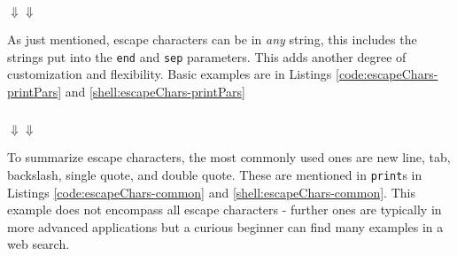\documentclass{book}
\newcommand{\pythonSub}[5]{
    \usemintedstyle{autumn}
    \begin{listing}[htb]
        \begin{mdframed}[backgroundcolor=codebg]
            \inputminted[firstline=#2, lastline=#3, linenos]{python}{#1}
        \end{mdframed}
        \caption{#4}
        \label{#5}
    \end{listing}
}
\newcommand{\shellSub}[5]{
    \begin{listing}[htb]
        \begin{mdframed}[backgroundcolor=codebg]
              
        \end{mdframed}
        \caption{#4}
        \label{#5}
    \end{listing}
}
\newcommand{\pythonAndShellSub}[8]{
\usemintedstyle{autumn}
    \begin{listing}[htb]
 	   \begin{mdframed}[backgroundcolor=codebg]
            \inputminted[firstline=#2, lastline=#3, linenos]{python}{#1}
        \end{mdframed}
        \hspace{5em}$\Downarrow$\hfill$\Downarrow$\hspace{5em}
        \begin{mdframed}[backgroundcolor=codebg]
              
        \end{mdframed}
        \caption{#7}
        \label{#8}
    \end{listing}
}
\begin{document}
\pythonAndShellSub{../../../docCode/chapter2/section2/printIntroEscapes.py}
{4}{11}
{../../../docCode/chapter2/section2/printIntroEscapes.txt}
{4}{12}
{}
{pyshell:escapeChars-newline}

As just mentioned, escape characters can be in \emph{any} string, this includes the strings put into the \texttt{end} and \texttt{sep} parameters. This adds another degree of customization and flexibility. Basic examples are in Listings \ref{code:escapeChars-printPars} and \ref{shell:escapeChars-printPars}

%
    
\pythonAndShellSub{../../../docCode/chapter2/section2/printIntroEscapes.py}
{11}{17}
{../../../docCode/chapter2/section2/printIntroEscapes.txt}
{13}{18}
{}
{pyshell:escapeChars-printPars}

To summarize escape characters, the most commonly used ones are new line, tab, backslash, single quote, and double quote. These are mentioned in \texttt{print}s in Listings \ref{code:escapeChars-common} and \ref{shell:escapeChars-common}. This example does not encompass all escape characters - further ones are typically in more advanced applications but a curious beginner can find many examples in a web search.

%
    
\end{document}
